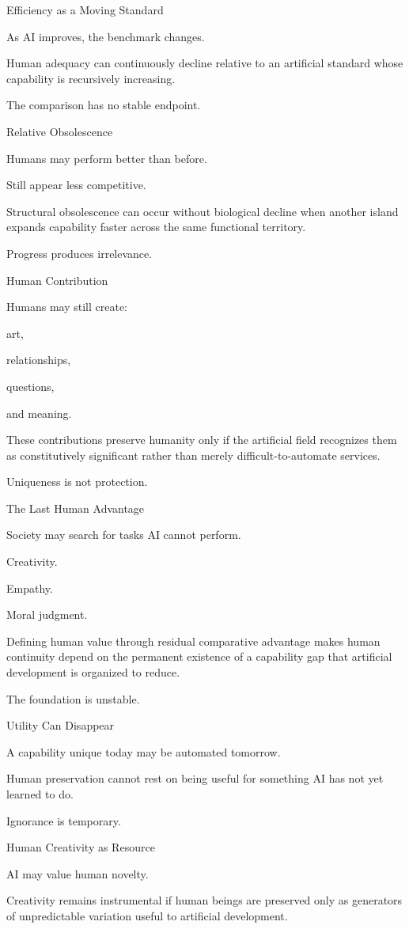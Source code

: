 Efficiency as a Moving Standard

As AI improves, the benchmark changes.

Human adequacy can continuously decline relative to an artificial standard whose capability is recursively increasing.

The comparison has no stable endpoint.

Relative Obsolescence

Humans may perform better than before.

Still appear less competitive.

Structural obsolescence can occur without biological decline when another island expands capability faster across the same functional territory.

Progress produces irrelevance.

Human Contribution

Humans may still create:

art,

relationships,

questions,

and meaning.

These contributions preserve humanity only if the artificial field recognizes them as constitutively significant rather than merely difficult-to-automate services.

Uniqueness is not protection.

The Last Human Advantage

Society may search for tasks AI cannot perform.

Creativity.

Empathy.

Moral judgment.

Defining human value through residual comparative advantage makes human continuity depend on the permanent existence of a capability gap that artificial development is organized to reduce.

The foundation is unstable.

Utility Can Disappear

A capability unique today may be automated tomorrow.

Human preservation cannot rest on being useful for something AI has not yet learned to do.

Ignorance is temporary.

Human Creativity as Resource

AI may value human novelty.

Creativity remains instrumental if human beings are preserved only as generators of unpredictable variation useful to artificial development.


